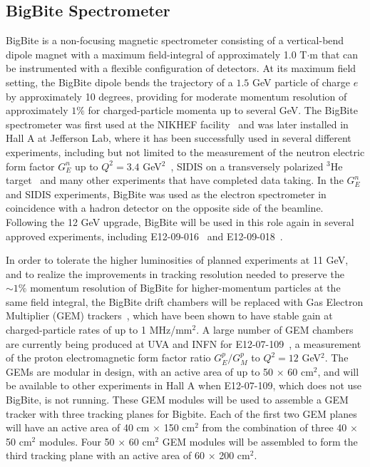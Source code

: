 \subsection{BigBite Spectrometer}
%
%
BigBite is a non-focusing magnetic spectrometer consisting of a vertical-bend dipole magnet with a maximum field-integral of approximately 1.0 T$\cdot$m that can be instrumented with a flexible configuration of detectors. At its maximum field setting, the BigBite dipole bends the trajectory of a $1.5$ GeV particle of charge $e$ by approximately 10 degrees, providing for moderate momentum resolution of approximately $1\%$ for charged-particle momenta up to several GeV. The BigBite spectrometer was first used at the NIKHEF facility~\cite{BigBite1998,BigBiteOptics1998} and was later installed in Hall A at Jefferson Lab, where it has been successfully used in several different experiments, including but not limited to the measurement of the neutron electric form factor $G_E^n$ up to $Q^2 = 3.4$ GeV$^2$~\cite{GEN2010}, SIDIS on a transversely polarized $^3$He target~\cite{E06010_AUT_PRL} and many other experiments that have completed data taking.   In the $G_E^n$ and SIDIS experiments, BigBite was used as the electron spectrometer in coincidence with a hadron detector on the opposite side of the beamline. Following the 12 GeV upgrade, BigBite will be used in this role again in several approved experiments, including E12-09-016~\cite{GEN2} and E12-09-018~\cite{SBS_SIDIS}.

In order to tolerate the higher luminosities of planned experiments at 11 GeV, and to realize the improvements in tracking resolution needed to preserve the $\sim1\%$ momentum resolution of BigBite for higher-momentum particles at the same field integral, the BigBite drift chambers will be replaced with Gas Electron Multiplier (GEM) trackers~\cite{Sauli_GEM, GEM_test_1999}, which have been shown to have stable gain at charged-particle rates of up to 1 MHz/mm$^2$. A large number of GEM chambers are currently being produced at UVA and INFN for  E12-07-109~\cite{GEP5}, a measurement of the proton electromagnetic form factor ratio $G_E^p/G_M^p$ to $Q^2 = 12$ GeV$^2$. The GEMs are modular in design, with an active area of up to 50 $\times$ 60 cm$^2$, and will be available to other experiments in Hall A when E12-07-109, which does not use BigBite, is not running. These GEM modules will be used to assemble a GEM tracker  with three tracking planes for Bigbite. Each of the first two GEM planes will  have an  active area of 40 cm $\times$ 150 cm$^2$ from the combination of three   40 $\times$ 50 cm$^2$ modules. Four 50 $\times$ 60 cm$^2$ GEM modules will be assembled to form the third tracking plane with an active area of 60 $\times$ 200 cm$^2$.    


